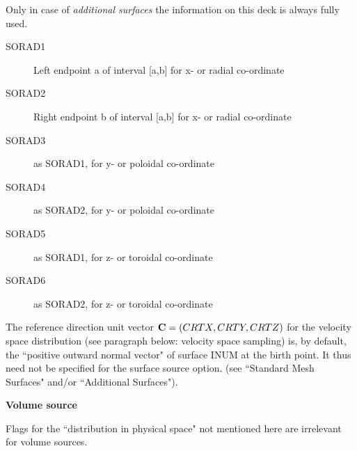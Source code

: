 Only in case of \emph{additional surfaces} the information on this deck is
always fully used.
\begin{description}
  \item[SORAD1] Left endpoint a of interval [a,b] for x- or radial co-ordinate
  \item[SORAD2] Right endpoint b of interval [a,b] for x- or radial co-ordinate
  \item[SORAD3] as SORAD1, for y- or poloidal co-ordinate
  \item[SORAD4] as
        SORAD2, for y- or poloidal co-ordinate
  \item[SORAD5] as SORAD1, for z- or
        toroidal co-ordinate
  \item[SORAD6] as SORAD2, for z- or toroidal co-ordinate
\end{description}

The reference direction unit vector $\mathbf{C} = (CRTX,CRTY,CRTZ)$ for the velocity
space distribution (see paragraph below: velocity space sampling) is, by
default, the ``positive outward normal vector" of surface INUM at the birth
point.
It thus need not be specified for the surface source option.
(see ``Standard Mesh Surfaces" and/or ``Additional Surfaces").

\medskip

\textcolor[rgb]{0.00,0.00,1.00}{\textbf{Volume source}}

Flags for the ``distribution in physical space" not mentioned here are
irrelevant for volume sources.

